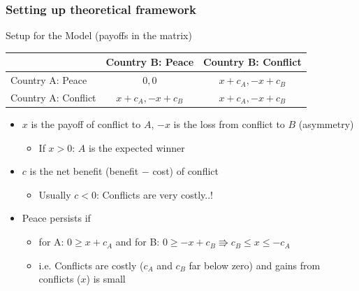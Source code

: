\documentclass[aspectratio=169]{beamer}
\begin{document}
\begin{frame}
\frametitle{Setting up theoretical framework} 
Setup for the Model (payoffs in the matrix)
\begin{center}
\begin{tabular}{|l|c |c |}
\hline
& Country B: Peace  &Country B: Conflict\\ \hline
 Country A: Peace   & $0,0$ & $x+c_A, -x + c_B$ \\ \hline
 Country A: Conflict &$x+c_A, -x + c_B$ & $x+c_A, -x + c_B$\\ \hline
\end{tabular}
\end{center}
\begin{itemize}\setlength\itemsep{3pt}
\item $x$ is the payoff of conflict to $A$, $-x$ is the loss from conflict to $B$  (asymmetry)
\begin{itemize}
\item If $x>0$: $A$ is the expected winner
\end{itemize}
\item $c$ is the net benefit (benefit $-$ cost) of conflict
\begin{itemize}
\item Usually $c<0$: Conflicts are very costly..!
\end{itemize}
\item Peace persists if
\begin{itemize}
  \item for A: $0\geq x+c_A $ and for B: $0\geq -x + c_B \Rrightarrow c_B \leq x \leq -c_A$
  \item i.e. Conflicts are costly ($c_A$ and $c_B$ far below zero) and gains from conflicts ($x$) is small
\end{itemize}
\end{itemize}
\end{frame}
\end{document}

